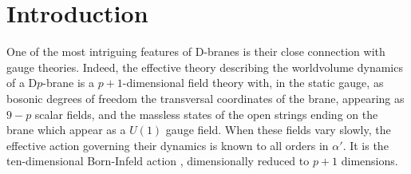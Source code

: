 \documentclass[12pt,a4paper]{article}
\begin{document}
\newpage

\pagestyle{plain}

\setcounter{section}{0}
\section{Introduction\label{Intro}}

One of the most intriguing features of D-branes is
their close connection with gauge theories.
Indeed, the effective theory describing the worldvolume dynamics of a
D$p$-brane is a $p+1$-dimensional field theory with, in the static gauge,
as bosonic degrees of freedom the transversal coordinates of the brane,
appearing as $9-p$ scalar fields, and the massless states of the open strings
ending on the brane which appear as a $U(1)$ gauge field.
When these fields vary slowly, the effective
action governing their dynamics is known to all orders in $\alpha '$.
It is the ten-dimensional
Born-Infeld action \cite{AT}, dimensionally reduced to $p+1$ dimensions.
\end{document}
